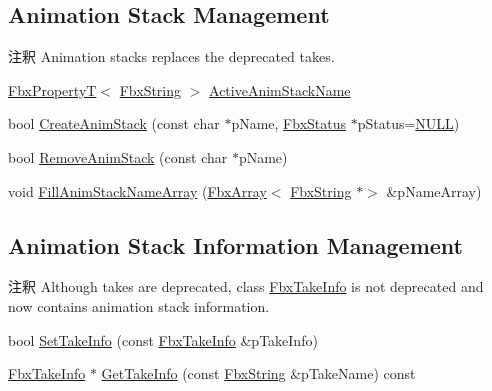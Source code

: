 \subsection*{Animation Stack Management}
\label{_amgrp94b0fe1405ba5e573bd029ebe0c96e5d}%
\begin{DoxyRemark}{注釈}
Animation stacks replaces the deprecated takes. 
\end{DoxyRemark}
\begin{DoxyCompactItemize}
\item 
\hyperlink{class_fbx_property_t}{Fbx\+PropertyT}$<$ \hyperlink{class_fbx_string}{Fbx\+String} $>$ \hyperlink{class_fbx_document_aec6d5eb0a7367383477588c087b09b87}{Active\+Anim\+Stack\+Name}
\item 
bool \hyperlink{class_fbx_document_a8180ba3b0b34f301703d77adc912a3a5}{Create\+Anim\+Stack} (const char $\ast$p\+Name, \hyperlink{class_fbx_status}{Fbx\+Status} $\ast$p\+Status=\hyperlink{fbxarch_8h_a070d2ce7b6bb7e5c05602aa8c308d0c4}{N\+U\+LL})
\item 
bool \hyperlink{class_fbx_document_a7f74b885faf1308f36a3923a0a27dc8b}{Remove\+Anim\+Stack} (const char $\ast$p\+Name)
\item 
void \hyperlink{class_fbx_document_a7a60224db8d86ec61e66263bbb683d4e}{Fill\+Anim\+Stack\+Name\+Array} (\hyperlink{class_fbx_array}{Fbx\+Array}$<$ \hyperlink{class_fbx_string}{Fbx\+String} $\ast$$>$ \&p\+Name\+Array)
\end{DoxyCompactItemize}
\subsection*{Animation Stack Information Management}
\label{_amgrp8856145b93782f6fd8b5c7593b27812c}%
\begin{DoxyRemark}{注釈}
Although takes are deprecated, class \hyperlink{class_fbx_take_info}{Fbx\+Take\+Info} is not deprecated and now contains animation stack information. 
\end{DoxyRemark}
\begin{DoxyCompactItemize}
\item 
bool \hyperlink{class_fbx_document_ace5043bd6c9883d00cfb6a2eb6d74d5c}{Set\+Take\+Info} (const \hyperlink{class_fbx_take_info}{Fbx\+Take\+Info} \&p\+Take\+Info)
\item 
\hyperlink{class_fbx_take_info}{Fbx\+Take\+Info} $\ast$ \hyperlink{class_fbx_document_aa524095dfb1dcac18f7b359070841068}{Get\+Take\+Info} (const \hyperlink{class_fbx_string}{Fbx\+String} \&p\+Take\+Name) const
\end{DoxyCompactItemize}
